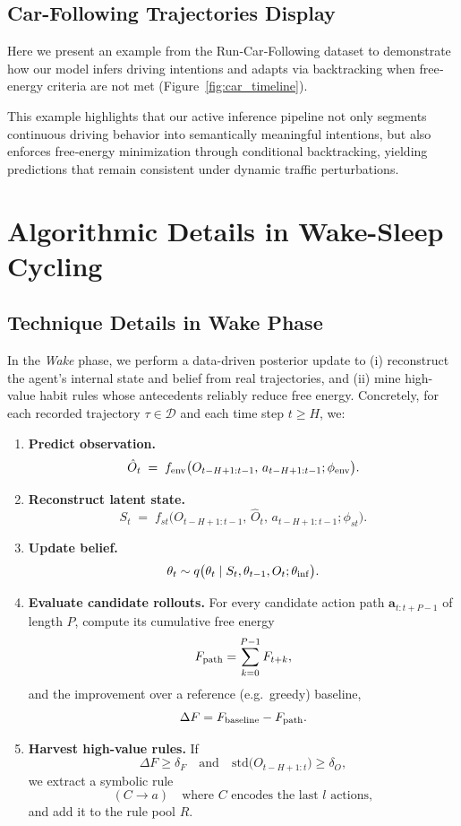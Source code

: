 \documentclass{article} %
\begin{document}
\subsection{Car-Following Trajectories Display}
\label{sec:car_display}

Here we present an example from the Run‐Car‐Following dataset to demonstrate how our model infers driving intentions and adapts via backtracking when free‐energy criteria are not met (Figure~\ref{fig:car_timeline}). 

This example highlights that our active inference pipeline not only segments continuous driving behavior into semantically meaningful intentions, but also enforces free‐energy minimization through conditional backtracking, yielding predictions that remain consistent under dynamic traffic perturbations.

\section{Algorithmic Details in Wake-Sleep Cycling}
\label{Sec:E}
\subsection{Technique Details in Wake Phase}
\label{sec:Wake}

In the \emph{Wake} phase, we perform a data-driven posterior update to (i) reconstruct the agent’s internal state and belief from real trajectories, and (ii) mine high-value habit rules whose antecedents reliably reduce free energy.  Concretely, for each recorded trajectory $\tau\in\mathcal D$ and each time step $t\ge H$, we:

\begin{enumerate}[label=(\arabic*)]
  \item \textbf{Predict observation.}  
    $$\hat O_t \;=\; f_{\rm env}\bigl(O_{t-H+1:t-1},\,a_{t-H+1:t-1};\phi_{\rm env}\bigr).$$
  \item \textbf{Reconstruct latent state.}  
    $$S_t \;=\; f_{st}\bigl(O_{t-H+1:t-1},\,\hat O_t,\,a_{t-H+1:t-1};\phi_{st}\bigr).$$
  \item \textbf{Update belief.}  
    $$\theta_t\sim q\bigl(\theta_t\mid S_t,\theta_{t-1},O_t;\theta_{\rm inf}\bigr).$$
  \item \textbf{Evaluate candidate rollouts.}  
    For every candidate action path $\mathbf a_{t:t+P-1}$ of length $P$, compute its cumulative free energy
    $$F_{\rm path}=\sum_{k=0}^{P-1}F_{t+k},$$
    and the improvement over a reference (e.g.\ greedy) baseline,
    $$\Delta F = F_{\rm baseline}-F_{\rm path}.$$
  \item \textbf{Harvest high-value rules.}  
    If
    $$\Delta F \ge \delta_F
      \quad\text{and}\quad
      \mathrm{std}\bigl(O_{t-H+1:t}\bigr)\ge \delta_O,$$
    we extract a symbolic rule
    $$(C \!\to\! a)\quad\text{where }C\text{ encodes the last }l\text{ actions},$$
    and add it to the rule pool $R$.
\end{enumerate}
\end{document}
